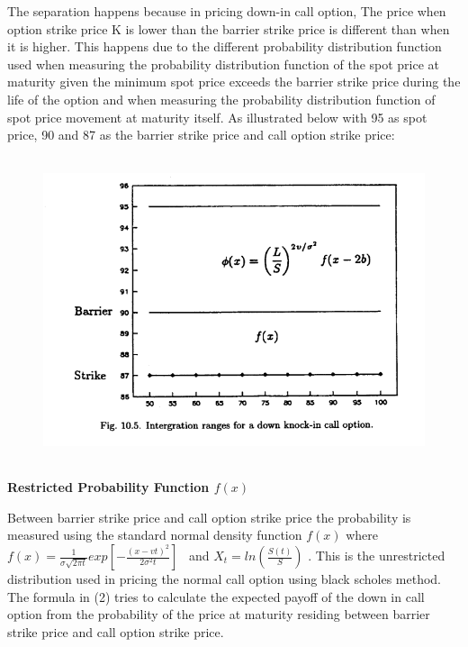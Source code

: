 \documentclass[12pt]{article}
\renewcommand{\_}{\kern-1.5pt\textunderscore\kern-1.5pt}
\begin{document}
\vspace{\baselineskip}
The separation happens because in pricing down-in call option, The price when option strike price K is lower than the barrier strike price is different than when it is higher. This happens due to the different probability distribution function used when measuring the probability distribution function of the spot price at maturity given the minimum spot price exceeds the barrier strike price during the life of the option and when measuring the probability distribution function of spot price movement at maturity itself. As illustrated below with 95 as spot price, 90 and 87 as the barrier strike price and call option strike price:\par




\begin{figure}[H]
	\begin{Center}
		\includegraphics[width=4.94in,height=3.53in]{./media/image1.png}
	\end{Center}
\end{figure}



\par

\textbf{Restricted Probability Function  \( f \left( x \right)  \) }\par

Between barrier strike price and call option strike price the probability is measured using the standard normal density function  \( f \left( x \right)  \)  where  \( f \left( x \right) =\frac{1}{ \sigma \sqrt{2 \pi t}}exp⁡ \left[ -\frac{ \left( x-vt \right) ^{2}}{2 \sigma ^{2}t} \right]  \) \ and   \( X_{t}=ln⁡ \left( \frac{S \left( t \right) }{S} \right)  \) . This is the unrestricted distribution used in pricing the normal call option using black scholes method. The formula in (2) tries to calculate the expected payoff of the down in call option from the probability of the price at maturity residing between barrier strike price and call option strike price. \par
\end{document}
